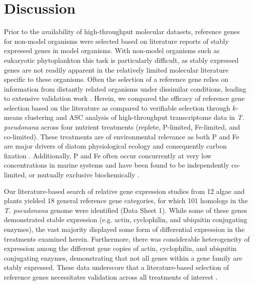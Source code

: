 \section{Discussion}
	Prior to the availability of high-throughput molecular datasets, reference genes for non-model organisms were selected based on literature reports of stably expressed genes in model organisms. With non-model organisms such as eukaryotic phytoplankton this task is particularly difficult, as stably expressed genes are not readily apparent in the relatively limited molecular literature specific to these organisms. Often the selection of a reference gene relies on information from distantly related organisms under dissimilar conditions, leading to extensive validation work \citep{McDonald2010, Whitney2011a}. Herein, we compared the efficacy of reference gene selection based on the literature as compared to verifiable selection through $k$-means clustering and ASC analysis of high-throughput transcriptome data in \textit{T. pseudonana} across four nutrient treatments (replete, P-limited, Fe-limited, and co-limited). These treatments are of environmental relevance as both P and Fe are major drivers of diatom physiological ecology and consequently carbon fixation \citep{Moore2004}. Additionally, P and Fe often occur concurrently at very low concentrations in marine systems and have been found to be independently co-limited, or mutually exclusive biochemically \citep{Saito2008}.\par
	Our literature-based search of relative gene expression studies from 12 algae and plants yielded 18 general reference gene categories, for which 101 homologs in the \textit{T. pseudonana} genome were identified (Data Sheet 1). While some of these genes demonstrated stable expression (e.g. actin, cyclophilin, and ubiquitin conjugating enzymes), the vast majority displayed some form of differential expression in the treatments examined herein. Furthermore, there was considerable heterogeneity of expression among the different gene copies of actin, cyclophilin, and ubiquitin conjugating enzymes, demonstrating that not all genes within a gene family are stably expressed. These data underscore that a literature-based selection of reference genes necessitates validation across all treatments of interest \citep{Vandesompele2002, Pfaffl2004}. \par
